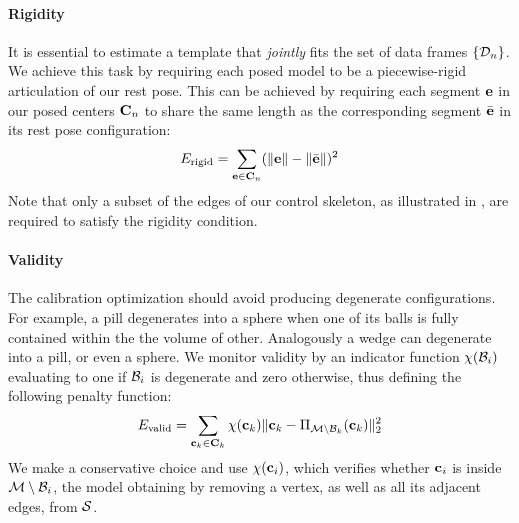 \paragraph{Rigidity}
It is essential to estimate a template that \emph{jointly} fits the set of data frames $\{ \mathcal{D}_n \}$. We achieve this task by requiring each posed model to be a piecewise-rigid articulation of our rest pose. This can be achieved by requiring each segment $\mathbf{e}$ in our posed centers ${\mathbf{C}}_n$ to share the same length as the corresponding segment $\bar{\mathbf{e}}$ in its rest pose configuration:
% 
\begin{equation}
E_{\text{rigid}} = \sum_{\mathbf{e} \in {\mathbf{C}}_n} (\| \mathbf{e} \| - \| \bar{\mathbf{e}} \|)^2
\end{equation}
% 
Note that only a subset of the edges of our control skeleton, as illustrated in , are required to satisfy the rigidity condition.

\paragraph{Validity}
The calibration optimization should avoid producing degenerate configurations. For example, a pill degenerates into a sphere when one of its balls is fully contained within the the volume of other. Analogously a wedge can degenerate into a pill, or even a sphere. We monitor validity by an indicator function $\chi(\mathcal{B}_i)$ evaluating to one if $\mathcal{B}_i$ is degenerate and zero otherwise, thus defining the following penalty function:
% 
\begin{equation}
E_{\text{valid}} = \sum_{\mathbf{c}_k \in {\mathbf{C}}_k} \chi(\mathbf{c}_k) \| \mathbf{c}_k - \Pi_{\mathcal{M} \setminus \mathcal{B}_k}(\mathbf{c}_k) \|_2^2
\end{equation}
% 
We make a conservative choice and use $\chi(\mathbf{c}_i)$, which verifies whether $\mathbf{c}_i$ is inside $\mathcal{M} \setminus \mathcal{B}_i$, the model obtaining by removing a vertex, as well as all its adjacent edges, from $\mathcal{S}$. 
